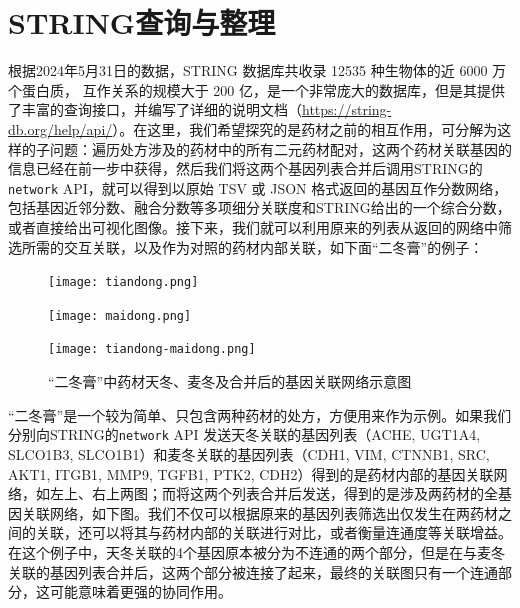 \section{STRING查询与整理}

根据2024年5月31日的数据，STRING 数据库共收录 12535 种生物体的近 6000 万个蛋白质， 互作关系的规模大于 200 亿，是一个非常庞大的数据库，但是其提供了丰富的查询接口，并编写了详细的说明文档（\url{https://string-db.org/help/api/}）。在这里，我们希望探究的是药材之前的相互作用，可分解为这样的子问题：遍历处方涉及的药材中的所有二元药材配对，这两个药材关联基因的信息已经在前一步中获得，然后我们将这两个基因列表合并后调用STRING的 \texttt{network} API，就可以得到以原始 TSV 或 JSON 格式返回的基因互作分数网络，包括基因近邻分数、融合分数等多项细分关联度和STRING给出的一个综合分数，或者直接给出可视化图像。接下来，我们就可以利用原来的列表从返回的网络中筛选所需的交互关联，以及作为对照的药材内部关联，如下面“二冬膏”的例子：


\begin{figure}[H]
  \centering
  \begin{minipage}[b]{0.4\textwidth}
      \centering
      \texttt{[image: tiandong.png]} %
  \end{minipage}
  \hspace{0.05\textwidth} %
  \begin{minipage}[b]{0.4\textwidth}
      \centering
      \texttt{[image: maidong.png]} %
  \end{minipage}

  \begin{minipage}[b]{0.95\textwidth}
      \centering
      \texttt{[image: tiandong-maidong.png]} %
  \end{minipage}
  \caption{“二冬膏”中药材天冬、麦冬及合并后的基因关联网络示意图}
\end{figure}

“二冬膏”是一个较为简单、只包含两种药材的处方，方便用来作为示例。如果我们分别向STRING的\texttt{network} API 发送天冬关联的基因列表（ACHE, UGT1A4, SLCO1B3, SLCO1B1）和麦冬关联的基因列表（CDH1, VIM, CTNNB1, SRC, AKT1, ITGB1, MMP9, TGFB1, PTK2, CDH2）得到的是药材内部的基因关联网络，如左上、右上两图；而将这两个列表合并后发送，得到的是涉及两药材的全基因关联网络，如下图。我们不仅可以根据原来的基因列表筛选出仅发生在两药材之间的关联，还可以将其与药材内部的关联进行对比，或者衡量连通度等关联增益。在这个例子中，天冬关联的4个基因原本被分为不连通的两个部分，但是在与麦冬关联的基因列表合并后，这两个部分被连接了起来，最终的关联图只有一个连通部分，这可能意味着更强的协同作用。

